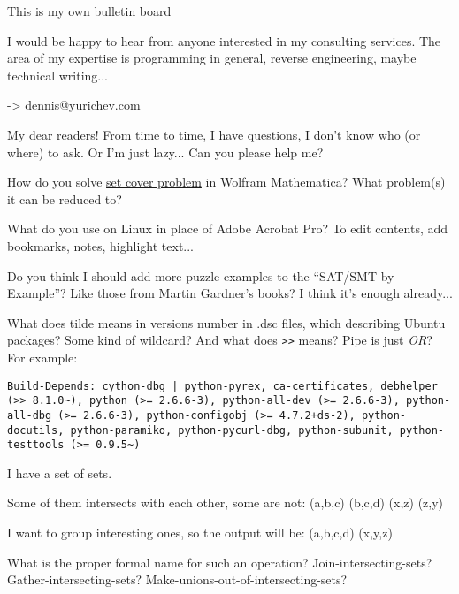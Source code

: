 
\begin{center}
\LARGE{} This is my own bulletin board \normalsize{}
\end{center}

I would be happy to hear from anyone interested in my consulting services.
The area of my expertise is programming in general, reverse engineering, maybe technical writing...

-> dennis@yurichev.com

\myhrule{}

My dear readers! From time to time, I have questions, I don't know who (or where) to ask.
Or I'm just lazy...
Can you please help me?

\myhrule{}

How do you solve \href{https://en.wikipedia.org/wiki/Set_cover_problem}{set cover problem} in Wolfram Mathematica?
What problem(s) it can be reduced to?

\myhrule{}

What do you use on Linux in place of Adobe Acrobat Pro?
To edit contents, add bookmarks, notes, highlight text...

\myhrule{}

Do you think I should add more puzzle examples to the ``SAT/SMT by Example''?
Like those from Martin Gardner's books?
I think it's enough already...

\myhrule{}

What does tilde means in versions number in .dsc files, which describing Ubuntu packages?
Some kind of wildcard?
And what does \verb|>>| means?
Pipe is just \emph{OR}?
For example:

\begin{lstlisting}
Build-Depends: cython-dbg | python-pyrex, ca-certificates, debhelper (>> 8.1.0~), python (>= 2.6.6-3), python-all-dev (>= 2.6.6-3), python-all-dbg (>= 2.6.6-3), python-configobj (>= 4.7.2+ds-2), python-docutils, python-paramiko, python-pycurl-dbg, python-subunit, python-testtools (>= 0.9.5~)
\end{lstlisting}

\myhrule{}

I have a set of sets.

Some of them intersects with each other, some are not: (a,b,c) (b,c,d) (x,z) (z,y)

I want to group interesting ones, so the output will be: (a,b,c,d) (x,y,z)

What is the proper formal name for such an operation?
Join-intersecting-sets?
Gather-intersecting-sets?
Make-unions-out-of-intersecting-sets?

